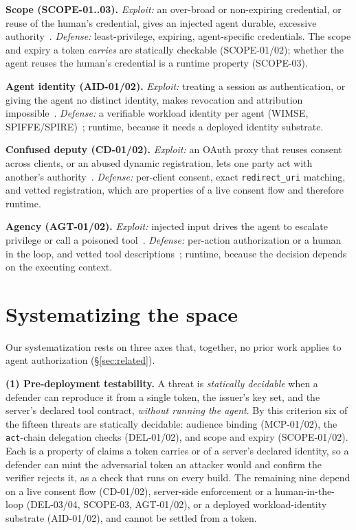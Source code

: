 \noindent\textbf{Scope (SCOPE-01..03).} \emph{Exploit:} an over-broad or
non-expiring credential, or reuse of the human's credential, gives an injected agent
durable, excessive authority~\cite{agentauth2025privmgmtmcp,agentauth2025progent}.
\emph{Defense:} least-privilege, expiring, agent-specific credentials. The scope and
expiry a token \emph{carries} are statically checkable (SCOPE-01/02); whether the
agent reuses the human's credential is a runtime property (SCOPE-03).

\noindent\textbf{Agent identity (AID-01/02).} \emph{Exploit:} treating a session as
authentication, or giving the agent no distinct identity, makes revocation and
attribution impossible~\cite{agentauth2026aiidentity,agentauth2025saga}.
\emph{Defense:} a verifiable workload identity per agent (WIMSE, SPIFFE/SPIRE)~\cite{wimse,spiffe,agentauth2026ehv};
runtime, because it needs a deployed identity substrate.

\noindent\textbf{Confused deputy (CD-01/02).} \emph{Exploit:} an OAuth proxy that
reuses consent across clients, or an abused dynamic registration, lets one party act
with another's authority~\cite{agentauth2026breakingprotocol,agentauth2025gluecode}.
\emph{Defense:} per-client consent, exact \texttt{redirect\_uri} matching, and vetted
registration, which are properties of a live consent flow and therefore runtime.

\noindent\textbf{Agency (AGT-01/02).} \emph{Exploit:} injected input drives the agent
to escalate privilege or call a poisoned tool~\cite{agentauth2023indirectpi,agentauth2025mcptox,agentauth2026unicodetag}.
\emph{Defense:} per-action authorization or a human in the loop, and vetted tool
descriptions~\cite{agentauth2025progent,agentauth2026trustdesc}; runtime, because the
decision depends on the executing context.

\section{Systematizing the space}\label{sec:syst}
Our systematization rests on three axes that, together, no prior work applies to
agent authorization (\S\ref{sec:related}).

\noindent\textbf{(1) Pre-deployment testability.} A threat is \emph{statically
decidable} when a defender can reproduce it from a single token, the issuer's key
set, and the server's declared tool contract, \emph{without running the agent}. By
this criterion six of the fifteen threats are statically decidable: audience binding
(MCP-01/02), the \texttt{act}-chain delegation checks (DEL-01/02), and scope and
expiry (SCOPE-01/02). Each is a property of claims a token carries or of a server's
declared identity, so a defender can mint the adversarial token an attacker would and
confirm the verifier rejects it, as a check that runs on every build. The remaining
nine depend on a live consent flow (CD-01/02), server-side enforcement or a
human-in-the-loop (DEL-03/04, SCOPE-03, AGT-01/02), or a deployed workload-identity
substrate (AID-01/02), and cannot be settled from a token.

